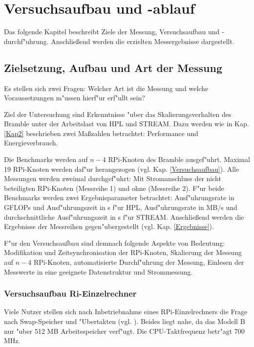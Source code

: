 \chapter{Versuchsaufbau und -ablauf}\label{Kap3}

Das folgende Kapitel beschreibt Ziele der Messung, Versuchsaufbau und -durchf"uhrung. Anschlie\ss end werden die erzielten Messergebnisse dargestellt. 

\section{Zielsetzung, Aufbau und Art der Messung}\label{Ziel}

Es stellen sich zwei Fragen: Welcher Art ist die Messung und welche Voraussetzungen m"ussen hierf"ur erf"ullt sein? 

Ziel der Untersuchung sind Erkenntnisse "uber das Skalierungsverhalten des Bramble unter der Arbeitslast von HPL und STREAM. Dazu werden wie in Kap. \ref{Kap2} beschrieben zwei Ma\ss zahlen betrachtet: Performance und Energieverbrauch.

Die Benchmarks werden auf $n-4$ RPi-Knoten des Bramble ausgef"uhrt. Maximal 19 RPi-Knoten werden daf"ur herangezogen (vgl. Kap. \ref{Versuchsaufbau}). Alle Messungen werden zweimal durchgef"uhrt: Mit Stromanschluss der nicht beteiligten RPi-Knoten (Messreihe 1) und ohne (Messreihe 2). F"ur beide Benchmarks werden zwei Ergebnisparameter betrachtet: Ausf"uhrungsrate in GFLOPs und Ausf"uhrungszeit in s f"ur HPL, Ausf"uhrungsrate in MB/s und durchschnittliche Ausf"uhrungszeit in s f"ur STREAM. Anschlie\ss end werden die Ergebnisse der Messreihen gegen"ubergestellt (vgl. Kap. \ref{Ergebnisse}). 

F"ur den Versuchsaufbau sind demnach folgende Aspekte von Bedeutung: Modifikation und Zeitsynchronisation der RPi-Knoten, Skalierung der Messung auf $n-4$ RPi-Knoten, automatisierte Durchf"uhrung der Messung, Einlesen der Messwerte in eine geeignete Datenstruktur und Strommessung.  

\subsection{Versuchsaufbau Ri-Einzelrechner}\label{RPi-Versuchsaufbau}

Viele Nutzer stellen sich nach Inbetriebnahme eines RPi-Einzelrechners die Frage nach Swap-Speicher und "Ubertakten (vgl. \cite{pow12}). Beides liegt nahe, da das Modell B nur "uber 512 MB Arbeitsspeicher verf"ugt. Die CPU-Taktfrequenz betr"agt 700 MHz. 

